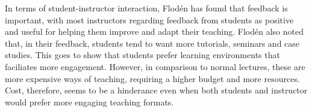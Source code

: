 In terms of student-instructor interaction, Flodén \cite{floden2017} has found that feedback is important, with most instructors regarding feedback from students as positive and useful for helping them improve and adapt their teaching. Flodén also noted that, in their feedback, students tend to want more tutorials, seminars and case studies. This goes to show that students prefer learning environments that faciliates more engagement. However, in comparison to normal lectures, these are more expensive ways of teaching, requiring a higher budget and more resources. Cost, therefore, seems to be a hinderance even when both students and instructor would prefer more engaging teaching formats.





